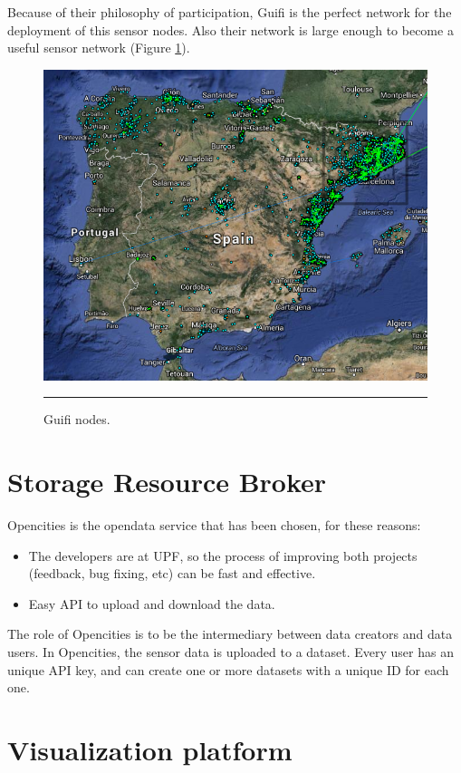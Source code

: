 \documentclass[12pt, a4paper,twoside]{tesi_upf}
\begin{document}
    Because of their philosophy of participation, Guifi is the perfect network for the deployment of this sensor nodes. Also their network is large enough to become a useful sensor network (Figure \ref{fig:Guifimap}).
    \begin{figure}[htbp]
      \centering
          \includegraphics[scale=0.5]{./Figures/Guifimap.png}
          \rule{25em}{0.5pt}
      \caption[Guifi nodes]{Guifi nodes.}
      \label{fig:Guifimap}
    \end{figure}
    
  \section{Storage Resource Broker}  
    Opencities \cite{opencities} is the opendata service that has been chosen, for these reasons:
    \begin{itemize}
      \item The developers are at UPF, so the process of improving both projects (feedback, bug fixing, etc) can be fast and effective.
      \item Easy API to upload and download the data.
    \end{itemize}
    
    The role of Opencities is to be the intermediary between data creators and data users.
    In Opencities, the sensor data is uploaded to a dataset. Every user has an unique API key, and can create one or more datasets with a unique ID for each one. 
    
  \section{Visualization platform}
    
\end{document}
